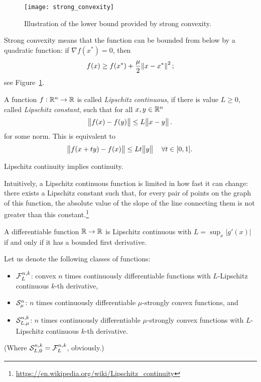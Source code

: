 \documentclass{article}
\begin{document}
\begin{figure}[h]
  \centering
  \texttt{[image: strong\_convexity]}
  \caption{Illustration of the lower bound provided by strong
    convexity.\label{fig:strong_convexity}}
\end{figure}

Strong convexity means that the function can be bounded from below by a quadratic function: if
\(\nabla f(x^*) = 0\), then
\begin{equation*}
  f(x) \geq f(x^*) + \frac{\mu}{2} \enVert{x - x^*}^2;
\end{equation*}
see Figure~\ref{fig:strong_convexity}.


\label{s:lipschitz_continuity}

A function \(f: \mathbb{R}^n \to \mathbb{R}\) is called \emph{Lipschitz continuous}, if there is value
\(L \geq 0\), called \emph{Lipschitz constant}, such that for all \(x, y \in \mathbb{R}^n\)
\begin{equation*}
  \enVert{f(x) - f(y)} \leq L \enVert[1]{x - y}.
\end{equation*}
for some norm.  This is equivalent to
\begin{equation*}
  \enVert{f(x + ty) - f(x)} \leq Lt \enVert[1]{y} \quad \forall t \in [0, 1].
\end{equation*}

Lipschitz continuity implies continuity.

Intuitively, a Lipschitz continuous function is limited in how fast it can change: there exists a
Lipschitz constant such that, for every pair of points on the graph of this function, the absolute
value of the slope of the line connecting them is not greater than this
constant.\footnote{\url{https://en.wikipedia.org/wiki/Lipschitz_continuity}}

A differentiable function \(\mathbb{R} \to \mathbb{R}\) is Lipschitz continuous with \(L = \sup_x |g'(x)|\) if
and only if it has a bounded first derivative.


Let us denote the following classes of functions:
\begin{itemize}
\item \(\mathcal{F}_{L}^{n, k}\): convex \(n\) times continuously differentiable functions with \(L\)-Lipschitz
  continuous \(k\)-th derivative,
\item \(\mathcal{S}_{\mu}^{n}\): \(n\) times continuously differentiable \(\mu\)-strongly
convex functions, and
\item \(\mathcal{S}_{L, \mu}^{n, k}\): \(n\) times continuously differentiable
  \(\mu\)-strongly convex functions with \(L\)-Lipschitz continuous \(k\)-th derivative.
\end{itemize}
(Where \(\mathcal{S}_{L, 0}^{n, k} = \mathcal{F}_{L}^{n, k}\), obviously.)
\end{document}

